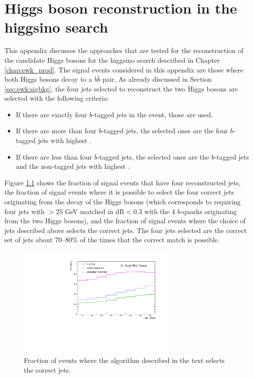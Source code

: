 \chapter{Higgs boson reconstruction in the higgsino search}
\label{app:higgs}

This appendix discusses the approaches that are tested for the reconstruction of the 
candidate Higgs bosons for the higgsino search described in Chapter \ref{chap:ewk_prod}. 
The signal events considered in this appendix are those where both Higgs bosons decay to a $b\bar{b}$ pair. 
As already discussed in Section \ref{sec:ewk:sigbkg}, the four jets selected to reconstruct the two Higgs bosons 
are selected with the following criteria:

\begin{itemize}
\item If there are exactly four $b$-tagged jets in the event, those are used.
\item If there are more than four $b$-tagged jets, the selected ones are the four $b$-tagged jets with highest \pt.
\item If there are less than four $b$-tagged jets, the selected ones are the $b$-tagged jets and the non-tagged jets with highest \pt.
\end{itemize}

Figure  \ref{fig:h_reco_match_possible}  shows the fraction of signal events that have four reconstructed jets, the fraction 
of signal events where it is possible to select the four correct jets originating from the decay of the Higgs bosons 
(which corresponds to requiring four jets with \pt $>$25 GeV  matched in dR$<$0.3 with the 4 $b$-quarks originating from the two Higgs bosons), 
and the fraction of signal events where the choice of jets described above selects the correct jets. 
The four jets selected are the correct set of jets about 70--80\% of the times that the correct match is possible. 


\begin{figure}[h]
\centering
\includegraphics[width=0.7\textwidth]{figures/App2/Rizzi-FigA2-1.pdf}
\caption{Fraction of events where the algorithm described in the text selects the correct jets.}
\label{fig:h_reco_match_possible}
\end{figure}


